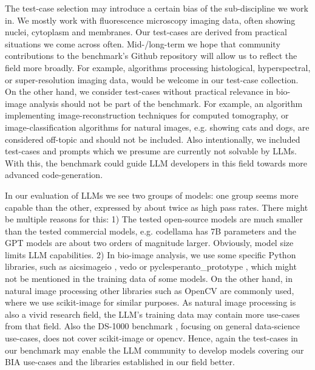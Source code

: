 \documentclass{ecai}
\begin{document}
The test-case selection may introduce a certain bias of the sub-discipline we work in. We mostly work with fluorescence microscopy imaging data, often showing nuclei, cytoplasm and membranes. Our test-cases are derived from practical situations we come across often. Mid-/long-term we hope that community contributions to the benchmark’s Github repository will allow us to reflect the field more broadly. For example, algorithms processing histological, hyperspectral, or super-resolution imaging data, would be welcome in our test-case collection. On the other hand, we consider test-cases without practical relevance in bio-image analysis should not be part of the benchmark. For example, an algorithm implementing image-reconstruction techniques for computed tomography, or image-classification algorithms for natural images, e.g. showing cats and dogs, are considered off-topic and should not be included. Also intentionally, we included test-cases and prompts which we presume are currently not solvable by LLMs. With this, the benchmark could guide LLM developers in this field towards more advanced code-generation.

In our evaluation of LLMs we see two groups of models: one group seems more capable than the other, expressed by about twice as high pass rates. There might be multiple reasons for this: 1) The tested open-source models are much smaller than the tested commercial models, e.g. codellama has 7B parameters and the GPT models are about two orders of magnitude larger. Obviously, model size limits LLM capabilities. 2) In bio-image analysis, we use some specific Python libraries, such as aicsimageio \citep{aicsimageio}, vedo \citep{musy2024} or pyclesperanto\_prototype \citep{robert_haase_2023_10432619}, which might not be mentioned in the training data of some models. On the other hand, in natural image processing other libraries such as OpenCV \citep{itseez2015opencv} are commonly used, where we use scikit-image \citep{scikit-image} for similar purposes. As natural image processing is also a vivid research field, the LLM’s training data may contain more use-cases from that field. Also the DS-1000 benchmark \citep{lai2022ds1000}, focusing on general data-science use-cases, does not cover scikit-image or opencv. Hence, again the test-cases in our benchmark may enable the LLM community to develop models covering our BIA use-cases and the libraries established in our field better.
\end{document}
